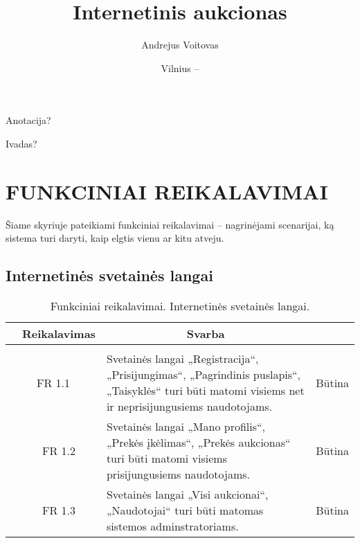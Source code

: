 \documentclass{VUMIFPSkursinis}
\title{Internetinis aukcionas}
\author{Andrejus Voitovas}
\date{Vilnius – \the\year}
\begin{document}
\maketitle
\cleardoublepage{}
\setcounter{page}{2}
Anotacija?
\newpage
\tableofcontents

Ivadas?
\newpage
\section{FUNKCINIAI REIKALAVIMAI}
Šiame skyriuje pateikiami funkciniai reikalavimai – nagrinėjami scenarijai, ką sistema turi daryti, kaip elgtis vienu ar kitu atveju.

\subsection{Internetinės svetainės langai}
\begin{table}[H]
	\caption{Funkciniai reikalavimai. Internetinės svetainės langai.}
	\begin{tabular}{|p{1cm}|p{1cm}|p{}|p{}|}
		\hline 
		\rowcolor{gray!50}
		\multicolumn{2}{|c|}{{\bfseries Kodas}}&
		\multicolumn{1}{c|}{{\bfseries Reikalavimas}}&
		\multicolumn{1}{c|}{{\bfseries Svarba}}\\
		\hline
		\rowcolor{lightgray}
		\multicolumn{4}{|c|}{Internetinės svetainės langai}\\		
		
		\hline
		\multicolumn{2}{|c|}{FR 1.1}&
		{Svetainės langai „Registracija“, „Prisijungimas“, „Pagrindinis puslapis“, „Taisyklės“ turi būti matomi visiems net ir neprisijungusiems naudotojams.
		}&		
		\multicolumn{1}{c|}{Būtina}\\
		\hline
		\multicolumn{1}{|c}{}&
		\multicolumn{1}{c|}{FR 1.2}&
		{Svetainės langai „Mano profilis“, „Prekės įkėlimas“, „Prekės aukcionas“ turi būti matomi visiems prisijungusiems naudotojams.
		}&		
		\multicolumn{1}{c|}{Būtina}\\
		\hline
		\multicolumn{1}{|c}{}&
		\multicolumn{1}{c|}{FR 1.3}&
		{Svetainės langai „Visi aukcionai“, „Naudotojai“  turi būti matomas sistemos adminstratoriams.
		}&
		\multicolumn{1}{c|}{Būtina}\\	
		\hline		
	\end{tabular}		
\end{table}
\end{document}
